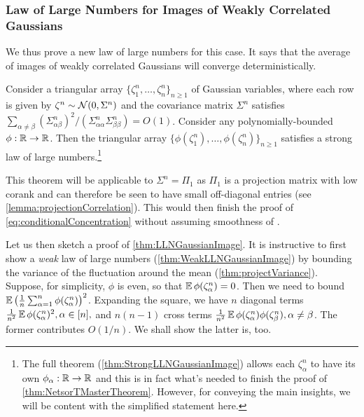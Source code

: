\documentclass[main.tex]{subfiles}
\begin{document}
\subsubsection{Law of Large Numbers for Images of Weakly Correlated Gaussians}
We thus prove a new law of large numbers for this case. It says that the average of images of weakly correlated Gaussians will converge deterministically.
\begin{thm}
 \label{thm:LLNGaussianImage} Consider a triangular array $\{\zeta_{1}^{n},\ldots,\zeta_{n}^{n}\}_{n\ge1}$ of Gaussian variables, where each row is given by $\zeta^{n}\sim\mathcal{N}(0,\Sigma^{n})$ and the covariance matrix $\Sigma^{n}$ satisfies $\sum_{\alpha\ne\beta}(\Sigma_{\alpha\beta}^{n})^{2}/(\Sigma_{\alpha\alpha}^n \Sigma_{\beta\beta}^n)=O(1)$. Consider any polynomially-bounded $\phi:\mathbb{R}\to\mathbb{R}$. Then the triangular array $\{\phi(\zeta_{1}^{n}),\ldots,\phi(\zeta_{n}^{n})\}_{n\ge1}$ satisfies a strong law of large numbers.\footnote{The full theorem (\cref{thm:StrongLLNGaussianImage}) allows each $\zeta_{\alpha}^{n}$ to have its own $\phi_{\alpha}:\mathbb{R}\to\mathbb{R}$ and this is in fact what's needed to finish the proof of \cref{thm:NetsorTMasterTheorem}. However, for conveying the main insights, we will be content with the simplified statement here.}
\end{thm}

This theorem will be applicable to $\Sigma^{n}=\Pi_{1}$ as $\Pi_{1}$ is a projection matrix with low corank and can therefore be seen to have small off-diagonal entries (see \cref{lemma:projectionCorrelation}).
This would then finish the proof of \cref{eq:conditionalConcentration} without assuming smoothness of .

Let us then sketch a proof of \cref{thm:LLNGaussianImage}. It is instructive to first show a \emph{weak} law of large numbers (\cref{thm:WeakLLNGaussianImage}) by bounding the variance of the fluctuation around the mean (\cref{thm:projectVariance}). Suppose, for simplicity, $\phi$ is even, so that $\operatorname*{\mathbb{E}}\phi(\zeta_{\alpha}^{n})=0$. Then we need to bound $\operatorname*{\mathbb{E}}\left(\frac{1}{n}\sum_{\alpha=1}^{n}\phi(\zeta_{\alpha}^{n})\right)^{2}$. Expanding the square, we have $n$ diagonal terms $\frac{1}{n^{2}}\operatorname*{\mathbb{E}}\phi(\zeta_{\alpha}^{n})^{2},\alpha\in[n],$ and $n(n-1)$ cross terms $\frac{1}{n^{2}}\operatorname*{\mathbb{E}}\phi(\zeta_{\alpha}^{n})\phi(\zeta_{\beta}^{n}),\alpha\ne\beta$. The former contributes $O(1/n)$. We shall show the latter is, too.
\end{document}
